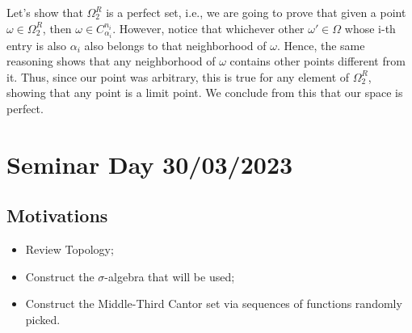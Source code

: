 \documentclass{article}
\begin{document}
Let's show that $\Omega _{2} ^{R}$ is a perfect set, i.e., we are going to prove that given a point $\omega\in\Omega _{2}^{R}$,
then $\omega\in{C _{\alpha_i}^{n_i}}.$ However, notice that whichever other $\omega'\in\Omega$ whose i-th entry is also
$\alpha_i$ also belongs to that neighborhood of $\omega$. Hence, the same reasoning shows that any neighborhood of
$\omega$ contains other points different from it. Thus, since our point was arbitrary, this is true for any element
of $\Omega _{2}^{R}$, showing that any point is a limit point. We conclude from this that our space is perfect.
\newpage

\section{Seminar Day 30/03/2023}
\subsection{Motivations}
\begin{itemize}
  \item Review Topology;
  \item Construct the $\sigma$-algebra that will be used;
  \item Construct the Middle-Third Cantor set via sequences of functions randomly picked.
\end{itemize}
\end{document}
